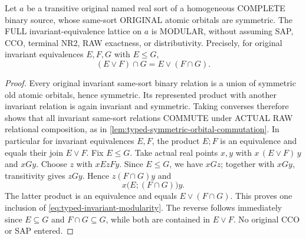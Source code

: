 \begin{lemma}
\label{lem:typed-invariant-equivalence-modularity}
Let $a$ be a transitive original named real sort
of a homogeneous COMPLETE binary source, whose
same-sort ORIGINAL atomic orbitals are symmetric.
The FULL invariant-equivalence lattice on $a$
is MODULAR, without assuming SAP, CCO,
terminal NR2, RAW exactness, or distributivity.
Precisely, for original invariant equivalences
$E,F,G$ with $E\le G$,
\[
             (E\vee F)\cap G
                    =E\vee(F\cap G).
\tag{MOD}\label{eq:typed-invariant-modularity}
\]
\end{lemma}
\begin{proof}
Every original invariant same-sort binary relation
is a union of symmetric old atomic orbitals, hence
symmetric. Its represented product with another
invariant relation is again invariant and symmetric.
Taking converses therefore shows that all invariant
same-sort relations COMMUTE under ACTUAL RAW
relational composition, as in
\cref{lem:typed-symmetric-orbital-commutation}.
In particular for invariant equivalences
$E,F$, the product $E;F$ is an equivalence
and equals their join $E\vee F$.
Fix $E\le G$.  Take actual real points
$x,y$ with
$x\,(E\vee F)\,y$ and $xGy$.
Choose $z$ with $xEzFy$.
Since $E\le G$, we have $xGz$;
together with $xGy$, transitivity
gives $zGy$. Hence
$z(F\cap G)y$ and
\[
                   x\bigl(E;(F\cap G)\bigr)y .
\]
The latter product is an equivalence
and equals $E\vee(F\cap G)$.
This proves one inclusion of
\eqref{eq:typed-invariant-modularity}.
The reverse follows immediately since
$E\subseteq G$ and $F\cap G\subseteq G$,
while both are contained in $E\vee F$.
No original CCO or SAP entered.
\end{proof}

